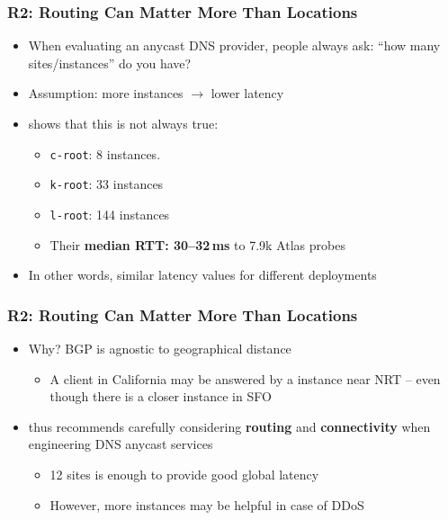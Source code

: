 \documentclass[11pt,show 
notes,notheorems,noamsthm,blank]{beamer} %
\begin{document}
\begin{frame}
 \frametitle{R2: Routing Can Matter More Than Locations}
 
 \begin{itemize}
  \item When evaluating an anycast DNS provider, people always ask:
       ``how many sites/instances'' do you have?
 \item Assumption: more instances $\rightarrow$ lower latency
 \item \cite{Schmidt17a} shows that this is not always true:
 
\begin{itemize}
 \item \texttt{c-root}: 8 instances. 
 \item \texttt{k-root}: 33 instances
 \item \texttt{l-root}: 144 instances
 \item Their\textbf{ median RTT: 30--32\,ms }to 7.9k Atlas probes
% 
\end{itemize}
 \item In other words, similar latency values for different deployments

 \end{itemize}

\end{frame}


\begin{frame}
 \frametitle{R2: Routing Can Matter More Than Locations}
 
\begin{itemize}
 \item Why? BGP is agnostic to geographical distance
 \begin{itemize}
  \item A client in California may be answered by a instance near NRT -- even 
though there is a closer instance in SFO
 \end{itemize}

\item \cite{Schmidt17a} thus recommends carefully considering
  \textbf{routing} and \textbf{connectivity} 
when engineering DNS anycast services

\begin{itemize}


 \item 12 sites is enough to provide good global latency 
 \item However, more instances may be helpful in case of DDoS~\cite{Moura16b}
\end{itemize}
\end{itemize}

\end{frame}
\end{document}
